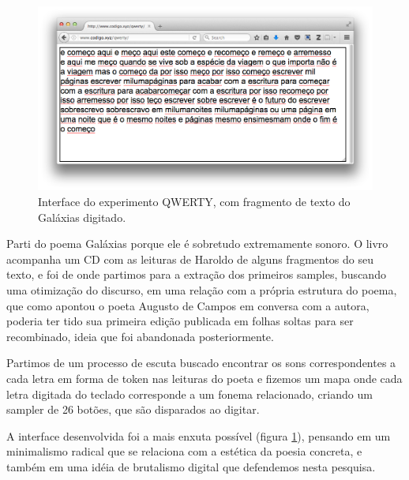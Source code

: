 \begin{figure}
    \caption{\label{qwerty}Interface do experimento QWERTY, com fragmento de texto do Galáxias digitado. }
    \begin{center}
    \includegraphics[width=1\linewidth]{pictures/cap3/qwerty.png}
    \end{center}
\end{figure}

Parti do poema Galáxias porque ele é sobretudo extremamente sonoro. O livro acompanha um CD com as leituras de Haroldo de alguns fragmentos do seu texto, e foi de onde partimos para a extração dos primeiros samples, buscando uma otimização do discurso, em uma relação com a própria estrutura do poema, que como apontou o poeta Augusto de Campos em conversa com a autora, poderia ter tido sua primeira edição publicada em folhas soltas para ser recombinado, ideia que foi abandonada posteriormente.

Partimos de um processo de escuta buscado encontrar os sons correspondentes a cada letra em forma de token nas leituras do poeta e fizemos um mapa onde cada letra digitada do teclado corresponde a um fonema relacionado, criando um sampler de 26 botões, que são disparados ao digitar.

A interface desenvolvida foi a mais enxuta possível (figura \ref{qwerty}), pensando em um minimalismo radical que se relaciona com a estética da poesia concreta, e também em uma idéia de brutalismo digital que defendemos nesta pesquisa.

